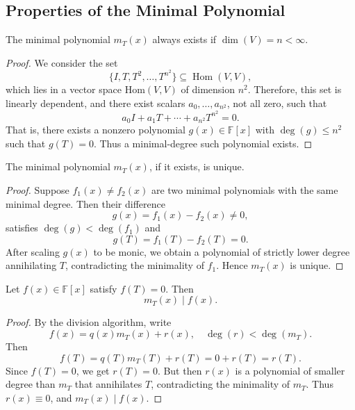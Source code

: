 \subsection{ Properties of the Minimal Polynomial}

\begin{proposition}[Existence]\label{prop:minpoly-existence}
The minimal polynomial \( m_T(x) \) always exists if \( \dim(V) = n < \infty \).
\end{proposition}

\begin{proof}
We consider the set
\[
\{ I, T, T^2, \dots, T^{n^2} \} \subseteq \operatorname{Hom}(V, V),
\]
which lies in a vector space $\mathrm{Hom}(V,V)$ of dimension \( n^2 \). Therefore, this set is linearly dependent, and there exist scalars \( a_0, \dots, a_{n^2} \), not all zero, such that
\[
a_0 I + a_1 T + \cdots + a_{n^2} T^{n^2} = 0.
\]
That is, there exists a nonzero polynomial \( g(x) \in \mathbb{F}[x] \) with \( \deg(g) \leq n^2 \) such that \( g(T) = 0 \). Thus a minimal-degree such polynomial exists.
\end{proof}

\begin{proposition}[Uniqueness]\label{prop:minpoly-uniqueness}
The minimal polynomial \( m_T(x) \), if it exists, is unique.
\end{proposition}

\begin{proof}
Suppose \( f_1(x) \neq f_2(x) \) are two minimal polynomials with the same minimal degree. Then their difference
\[
g(x) = f_1(x) - f_2(x) \neq 0,
\]
satisfies \( \deg(g) < \deg(f_1) \) and
\[
g(T) = f_1(T) - f_2(T) = 0.
\]
After scaling \( g(x) \) to be monic, we obtain a polynomial of strictly lower degree annihilating \( T \), contradicting the minimality of \( f_1 \). Hence \( m_T(x) \) is unique.
\end{proof}

\begin{proposition}[Divisibility]\label{prop:minpoly-divides}
Let \( f(x) \in \mathbb{F}[x] \) satisfy \( f(T) = 0 \). Then
\[
m_T(x) \mid f(x).
\]
\end{proposition}

\begin{proof}
By the division algorithm, write
\[
f(x) = q(x) m_T(x) + r(x), \quad \deg(r) < \deg(m_T).
\]
Then
\[
f(T) = q(T) m_T(T) + r(T) = 0 + r(T) = r(T).
\]
Since \( f(T) = 0 \), we get \( r(T) = 0 \). But then \( r(x) \) is a polynomial of smaller degree than \( m_T \) that annihilates \( T \), contradicting the minimality of \( m_T \). Thus \( r(x) \equiv 0 \), and \( m_T(x) \mid f(x) \).
\end{proof}

